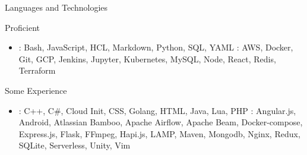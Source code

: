 \documentclass[]{mcdowellcv}
\begin{document}
    \begin{cvsection}{Languages and Technologies}
        \begin{cvsubsection}{Proficient}{}{}
            \begin{itemize}
                    \item {}: Bash, JavaScript, HCL, Markdown, Python, SQL, YAML \newline
                    : AWS, Docker, Git, GCP, Jenkins, Jupyter, Kubernetes, MySQL, Node, React, Redis, Terraform
            \end{itemize}
        \end{cvsubsection}
        \begin{cvsubsection}{Some Experience}{}{}
            \begin{itemize}
                    \item {}: C++, C\#, Cloud Init, CSS, Golang, HTML, Java, Lua, PHP  \newline
                    : Angular.js, Android, Atlassian Bamboo, Apache Airflow, Apache Beam,  Docker-compose, \newline Express.js, Flask, FFmpeg, Hapi.js, LAMP, Maven, Mongodb, Nginx, Redux, SQLite, Serverless, Unity, Vim
            \end{itemize}
        \end{cvsubsection}
    \end{cvsection}
\end{document}
